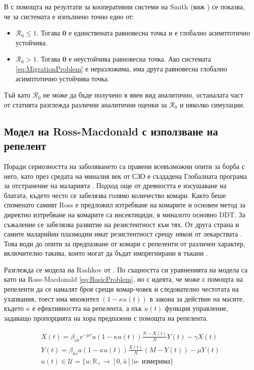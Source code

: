 В \cite{Bichara2016} с помощта на резултати за кооперативни системи на Smith (виж \cite{Smith1986}) се показва, че за системата е изпълнено точно едно от:
\begin{itemize}
  \item $\mathscr{R}_0 \leq 1$. Тогава $\mathbf{0}$ е единствената равновесна точка и е глобално асимптотично устойчива.
  \item $\mathscr{R}_0 > 1$. Тогава $\mathbf{0}$ е неустойчива равновесна точка. Ако системата \eqref{eq:MigrationProblem} е неразложима, има друга равновесна глобално асимптотично устойчива точка.
\end{itemize}

Тъй като $\mathscr{R}_0$ не може да бъде получено в явен вид аналитично, останалата част от статията \cite{Bichara2016} разглежда различни аналитични оценки за $\mathscr{R}_0$ и няколко симулации.

\subsection{Модел на Ross-Macdonald с използване на репелент}
Поради сериозността на заболяването са правени всевъзможни опити за борба с него, като през средата на миналия век от СЗО е създадена Глобалната програма за отстранение на маларията \cite{WHO2017}.
Подход още от древността е изсушаване на блатата, където често се забелязва голямо количество комари.
Както беше споменато самият Ross е предложил изтребване на комарите и основен метод за директно изтребване на комарите са инсектициди, в миналото основно DDT.
За съжаление се забелязва развитие на резистентност към тях.
От друга страна и самите маларийни плазмодии имат резистентност срещу някои от лекарствата \cite[глава~83]{Baron1996}.
Това води до опити за предпазване от комари с репеленти от различен характер, включително такива, които могат да бъдат импрегнирани в тъкани \cite{Grancaric2019}.

Разглежда се модела на Rashkov от \cite{Rashkov2022}.
По същността си уравненията на модела са като на Ross-Macdonald \eqref{eq:BasicProblem}, но с идеята, че може с помощта на репеленти да се намалят броя срещи комар-човек и следователно честотата на ухапвания, тоест има множител $(1 - \kappa u(t))$ в закона за действие на масите, където $\kappa$ е ефективността на репелента, а пък $u(t)$ функция управление, задаващо пропорцията на хора предпазени с помощта на репелента.

\begin{equation}
  \label{eq:RepellentProblem}
  \begin{split}
    &\dot{X}(t) = \beta_{vh} e^{-\mu \tau} a (1-\kappa u(t)) \frac{N-X(t)}{N} Y(t) - \gamma X(t) \\
    &\dot{Y}(t) = \beta_{hv} a (1-\kappa u(t)) \frac{X(t)}{N} (M-Y(t)) - \mu Y(t) \\
    &u(t) \in \mathscr{U} = \{u:\mathbb{R}_+ \rightarrow [0, \bar{u}] \vert u \text{- измерима}\}
  \end{split}
\end{equation}

